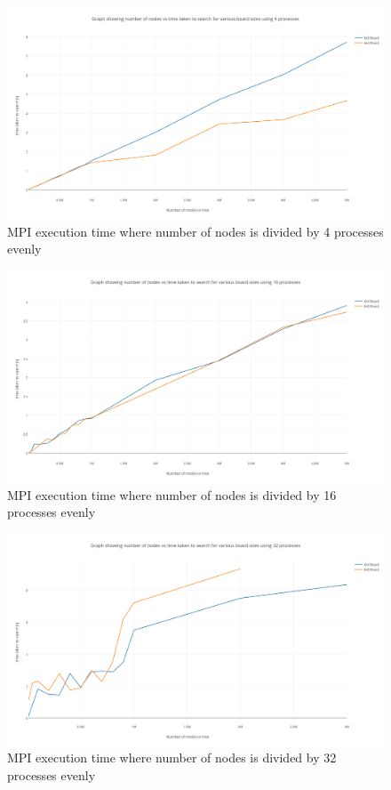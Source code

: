\documentclass[a4paper]{article}
\begin{document}
\begin{figure}[H]
	\centering
	\includegraphics[width=1.0\textwidth,scale=1.0]{images/mpi_4procs}
	\caption{MPI execution time where number of nodes is divided by 4 processes evenly}
\end{figure}

\begin{figure}[H]
	\centering
	\includegraphics[width=1.0\textwidth,scale=1.0]{images/mpi_16procs}
	\caption{MPI execution time where number of nodes is divided by 16 processes evenly}
\end{figure}

\begin{figure}[H]
	\centering
	\includegraphics[width=1.0\textwidth,scale=1.0]{images/mpi_32procs}
	\caption{MPI execution time where number of nodes is divided by 32 processes evenly}
\end{figure}
\end{document}
